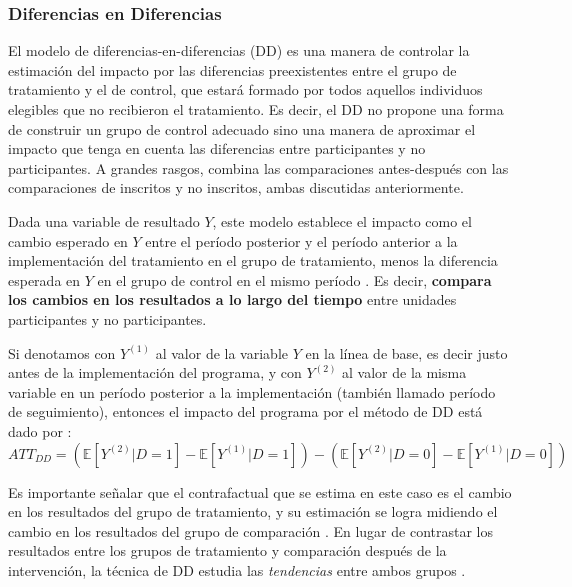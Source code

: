 \documentclass[../../main.tex]{subfiles}
\begin{document}
\subsubsection{Diferencias en Diferencias}
El modelo de diferencias-en-diferencias (DD) es una manera de controlar la estimación del
impacto por las diferencias preexistentes entre el grupo de tratamiento y el de control,
que estará formado por todos aquellos individuos elegibles que no recibieron el
tratamiento. Es decir, el DD no propone una forma de construir un grupo de control
adecuado sino una manera de aproximar el impacto que tenga en cuenta las diferencias entre
participantes y no participantes. A grandes rasgos, combina las comparaciones
antes-después con las comparaciones de inscritos y no inscritos, ambas discutidas
anteriormente.

Dada una variable de resultado \(Y\), este modelo establece el impacto como el cambio
esperado en \(Y\) entre el período posterior y el período anterior a la implementación del
tratamiento en el grupo de tratamiento, menos la diferencia esperada en \(Y\) en el grupo
de control en el mismo período \cite{bernal}. Es decir, \textbf{compara los cambios en los
resultados a lo largo del tiempo} entre unidades participantes y no participantes.

Si denotamos con \(Y^{(1)}\) al valor de la variable \(Y\) en la línea de base, es decir justo
antes de la implementación del programa, y con \(Y^{(2)}\) al valor de la misma variable en
un período posterior a la implementación (también llamado período de seguimiento),
entonces el impacto del programa por el método de DD está dado por\footnotemark
{}:
\begin{equation}
    ATT_{DD} =
        \left(
            \mathbb{E}\left[Y^{(2)}|D=1\right] - \mathbb{E}\left[Y^{(1)}|D=1\right]
        \right) -
        \left(
            \mathbb{E}\left[Y^{(2)}|D=0\right] - \mathbb{E}\left[Y^{(1)}|D=0\right]
        \right)
        \label{eq:dif-en-dif-1}
\end{equation}

Es importante señalar que el contrafactual que se estima en este caso es el cambio en los
resultados del grupo de tratamiento, y su estimación se logra midiendo el cambio en los
resultados del grupo de comparación \cite{gertler-2016}. En lugar de contrastar los
resultados entre los grupos de tratamiento y comparación después de la intervención, la
técnica de DD estudia las \textit{tendencias} entre ambos grupos \cite{gertler-2016}.
\end{document}
